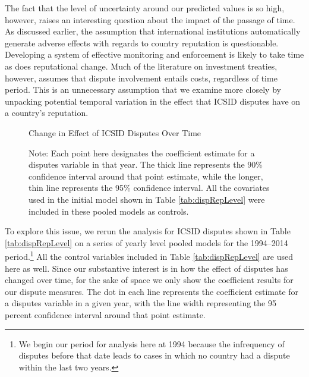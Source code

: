 \documentclass[12pt,onesided]{amsart}
\begin{document}

The fact that the level of uncertainty around our predicted values is so high, however, raises an interesting question about the impact of the passage of time. As discussed earlier, the assumption that international institutions automatically generate adverse effects with regards to country reputation is questionable. Developing a system of effective monitoring and enforcement is likely to take time as does reputational change. Much of the literature on investment treaties, however, assumes that dispute involvement entails costs, regardless of time period. This is an unnecessary assumption that we examine more closely by unpacking potential temporal variation in the effect that ICSID disputes have on a country's reputation.

\begin{figure}[ht]
	\centering
	\caption{Change in Effect of ICSID Disputes Over Time}
	\label{fig:dispEffectYear}
	\resizebox{1\textwidth}{!}{}
	\caption*{Note: Each point here designates the coefficient estimate for a disputes variable in that year. The thick line represents the 90\% confidence interval around that point estimate, while the longer, thin line represents the 95\% confidence interval. All the covariates used in the initial model shown in Table \ref{tab:dispRepLevel} were included in these pooled models as controls.}
\end{figure}
\FloatBarrier

To explore this issue, we rerun the analysis for ICSID disputes shown in Table \ref{tab:dispRepLevel} on a series of yearly level pooled models for the 1994--2014 period.\footnote{We begin our period for analysis here at 1994 because the infrequency of disputes before that date leads to cases in which no country had a dispute within the last two years.} All the control variables included in Table \ref{tab:dispRepLevel} are used here as well. Since our substantive interest is in how the effect of disputes has changed over time, for the sake of space we only show the coefficient results for our dispute measures. The dot in each line represents the coefficient estimate for a disputes variable in a given year, with the line width representing the 95 percent confidence interval around that point estimate. 
\end{document}
